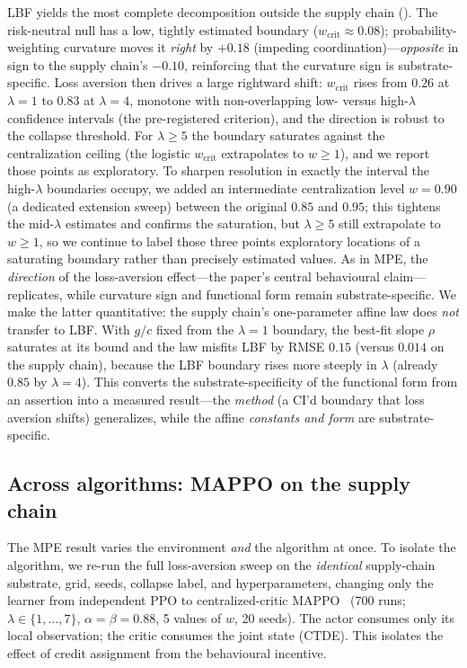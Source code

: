 \documentclass[letterpaper]{article}
\theoremstyle{plain}
\newcommand{\wcrit}{w_{\mathrm{crit}}}
\begin{document}
LBF yields the most complete decomposition outside the supply chain
(). The risk-neutral null has a low, tightly estimated
boundary ($\wcrit\approx0.08$); probability-weighting curvature moves it
\emph{right} by $+0.18$ (impeding coordination)---\emph{opposite} in sign to the
supply chain's $-0.10$, reinforcing that the curvature sign is substrate-specific.
Loss aversion then drives a large rightward shift: $\wcrit$ rises from $0.26$ at
$\lambda{=}1$ to $0.83$ at $\lambda{=}4$, monotone with non-overlapping low-
versus high-$\lambda$ confidence intervals (the pre-registered criterion), and
the direction is robust to the collapse threshold. For $\lambda{\geq}5$ the
boundary saturates against the centralization ceiling (the logistic $\wcrit$
extrapolates to $w{\geq}1$), and we report those points as exploratory. To
sharpen resolution in exactly the interval the high-$\lambda$ boundaries occupy,
we added an intermediate centralization level $w{=}0.90$ (a dedicated extension
sweep) between the original $0.85$ and $0.95$; this tightens the mid-$\lambda$
estimates and confirms the saturation, but $\lambda{\geq}5$ still extrapolate to
$w{\geq}1$, so we continue to label those three points exploratory locations of a
saturating boundary rather than precisely estimated values. As in
MPE, the \emph{direction} of the loss-aversion effect---the paper's central
behavioural claim---replicates, while curvature sign and functional form remain
substrate-specific. We make the latter quantitative: the supply chain's
one-parameter affine law does \emph{not} transfer to LBF. With $g/c$ fixed from
the $\lambda{=}1$ boundary, the best-fit slope $\rho$ saturates at its bound and
the law misfits LBF by RMSE $0.15$ (versus $0.014$ on the supply chain), because
the LBF boundary rises more steeply in $\lambda$ (already $0.85$ by $\lambda{=}4$).
This converts the substrate-specificity of the functional form from an assertion
into a measured result---the \emph{method} (a CI'd boundary that loss aversion
shifts) generalizes, while the affine \emph{constants and form} are
substrate-specific.

\subsection{Across algorithms: MAPPO on the supply chain}
\label{sec:appendix_crossalgo}

The MPE result varies the environment \emph{and} the algorithm at once. To
isolate the algorithm, we re-run the full loss-aversion sweep on the
\emph{identical} supply-chain substrate, grid, seeds, collapse label, and
hyperparameters, changing only the learner from independent PPO to
centralized-critic MAPPO~\citep{yu2022surprising} (700 runs;
$\lambda\in\{1,\ldots,7\}$, $\alpha{=}\beta{=}0.88$, 5 values of $w$, 20 seeds).
The actor consumes only its local observation; the critic consumes the joint
state (CTDE). This isolates the effect of credit assignment from the behavioural
incentive.
\end{document}
